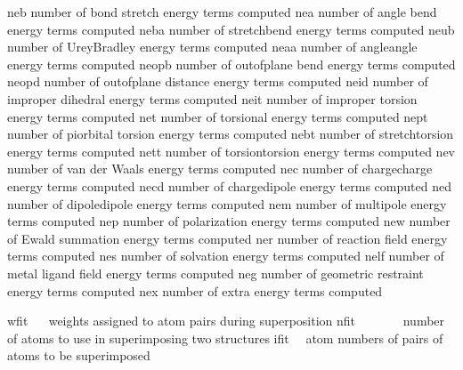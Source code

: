 \documentclass[letterpaper,11pt,english]{sphinxmanual}
\begin{document}
\begin{sphinxVerbatim}[commandchars=\\\{\}]
neb             number of bond stretch energy terms computed
nea             number of angle bend energy terms computed
neba            number of stretch\PYGZhy{}bend energy terms computed
neub            number of Urey\PYGZhy{}Bradley energy terms computed
neaa            number of angle\PYGZhy{}angle energy terms computed
neopb           number of out\PYGZhy{}of\PYGZhy{}plane bend energy terms computed
neopd           number of out\PYGZhy{}of\PYGZhy{}plane distance energy terms computed
neid            number of improper dihedral energy terms computed
neit            number of improper torsion energy terms computed
net             number of torsional energy terms computed
nept            number of pi\PYGZhy{}orbital torsion energy terms computed
nebt            number of stretch\PYGZhy{}torsion energy terms computed
nett            number of torsion\PYGZhy{}torsion energy terms computed
nev             number of van der Waals energy terms computed
nec             number of charge\PYGZhy{}charge energy terms computed
necd            number of charge\PYGZhy{}dipole energy terms computed
ned             number of dipole\PYGZhy{}dipole energy terms computed
nem             number of multipole energy terms computed
nep             number of polarization energy terms computed
new             number of Ewald summation energy terms computed
ner             number of reaction field energy terms computed
nes             number of solvation energy terms computed
nelf            number of metal ligand field energy terms computed
neg             number of geometric restraint energy terms computed
nex             number of extra energy terms computed
\end{sphinxVerbatim}


\begin{sphinxVerbatim}[commandchars=\\\{\}]
wfit            weights assigned to atom pairs during superposition
nfit            number of atoms to use in superimposing two structures
ifit            atom numbers of pairs of atoms to be superimposed
\end{sphinxVerbatim}

\end{document}
